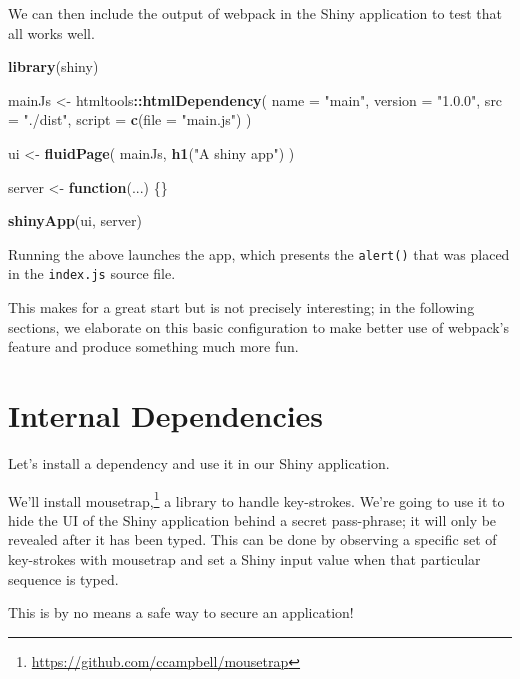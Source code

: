 \documentclass[10pt,]{krantz}
\makeatletter
\newenvironment{Shaded}{\begin{snugshade}}{\end{snugshade}}
\newcommand{\ControlFlowTok}[1]{\textcolor[rgb]{0.27,0.27,0.27}{\textbf{#1}}}
\newcommand{\DataTypeTok}[1]{\textcolor[rgb]{0.27,0.27,0.27}{#1}}
\newcommand{\KeywordTok}[1]{\textcolor[rgb]{0.27,0.27,0.27}{\textbf{#1}}}
\newcommand{\NormalTok}[1]{#1}
\newcommand{\OperatorTok}[1]{\textcolor[rgb]{0.43,0.43,0.43}{\textbf{#1}}}
\newcommand{\StringTok}[1]{\textcolor[rgb]{0.5,0.5,0.5}{#1}}
\renewcommand{\href}[2]{#2\footnote{\url{#1}}}
\newenvironment{kframe}{%
\medskip{}
\setlength{\fboxsep}{.8em}
 \def\at@end@of@kframe{}%
 \ifinner\ifhmode%
  \def\at@end@of@kframe{\end{minipage}}%
  \begin{minipage}{\columnwidth}%
 \fi\fi%
 \def\FrameCommand##1{\hskip\@totalleftmargin \hskip-\fboxsep
 \colorbox{shadecolor}{##1}\hskip-\fboxsep
     \hskip-\linewidth \hskip-\@totalleftmargin \hskip\columnwidth}%
 \MakeFramed {\advance\hsize-\width
   \@totalleftmargin\z@ \linewidth\hsize
   \@setminipage}}%
 {\par\unskip\endMakeFramed%
 \at@end@of@kframe}
\renewenvironment{Shaded}{\begin{kframe}}{\end{kframe}}
\newenvironment{rmdblock}[1]
  {
  \begin{itemize}
  \renewcommand{\labelitemi}{
    \raisebox{-.7\height}[0pt][0pt]{
      {\setkeys{Gin}{width=3em,keepaspectratio}\texttt{[image: images/\#1]}}
    }
  }
  \setlength{\fboxsep}{1em}
  \begin{kframe}
  \item
  }
  {
  \end{kframe}
  \end{itemize}
  }
\newenvironment{rmdnote}
  {\begin{rmdblock}{note}}
  {\end{rmdblock}}
\makeatother
\begin{document}
We can then include the output of webpack in the Shiny application to test that all works well.

\begin{Shaded}
\begin{Highlighting}[]
\KeywordTok{library}\NormalTok{(shiny)}

\NormalTok{mainJs <-}\StringTok{ }\NormalTok{htmltools}\OperatorTok{::}\KeywordTok{htmlDependency}\NormalTok{(}
  \DataTypeTok{name =} \StringTok{"main"}\NormalTok{,}
  \DataTypeTok{version =} \StringTok{"1.0.0"}\NormalTok{,}
  \DataTypeTok{src =} \StringTok{"./dist"}\NormalTok{,}
  \DataTypeTok{script =} \KeywordTok{c}\NormalTok{(}\DataTypeTok{file =} \StringTok{"main.js"}\NormalTok{)}
\NormalTok{)}

\NormalTok{ui <-}\StringTok{ }\KeywordTok{fluidPage}\NormalTok{(}
\NormalTok{  mainJs,}
  \KeywordTok{h1}\NormalTok{(}\StringTok{"A shiny app"}\NormalTok{)}
\NormalTok{)}

\NormalTok{server <-}\StringTok{ }\ControlFlowTok{function}\NormalTok{(...) \{\}}

\KeywordTok{shinyApp}\NormalTok{(ui, server)}
\end{Highlighting}
\end{Shaded}

Running the above launches the app, which presents the \texttt{alert()} that was placed in the \texttt{index.js} source file.

This makes for a great start but is not precisely interesting; in the following sections, we elaborate on this basic configuration to make better use of webpack's feature and produce something much more fun.

\hypertarget{webpack-intro-internal-dependencies}{%
\section{Internal Dependencies}\label{webpack-intro-internal-dependencies}}

Let's install a dependency and use it in our Shiny application.

We'll install \href{https://github.com/ccampbell/mousetrap}{mousetrap,} a library to handle key-strokes. We're going to use it to hide the UI of the Shiny application behind a secret pass-phrase; it will only be revealed after it has been typed. This can be done by observing a specific set of key-strokes with mousetrap and set a Shiny input value when that particular sequence is typed.

\begin{rmdnote}
This is by no means a safe way to secure an application!
\end{rmdnote}
\end{document}
